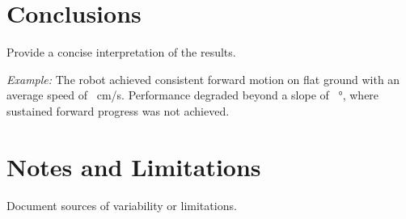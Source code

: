 \documentclass[11pt]{article}
\begin{document}
\section*{Conclusions}
Provide a concise interpretation of the results.

\textit{Example:} The robot achieved consistent forward motion on flat ground with an average speed of \underline{\hspace{1cm}}~cm/s. Performance degraded beyond a slope of \underline{\hspace{1cm}}~\si{\degree}, where sustained forward progress was not achieved.

\section*{Notes and Limitations}
Document sources of variability or limitations.
\end{document}
